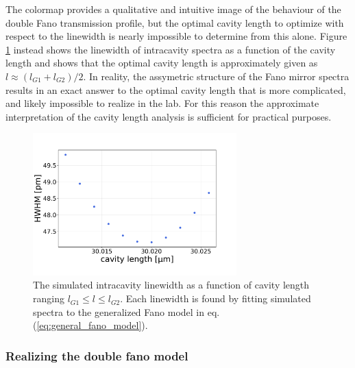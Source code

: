 The colormap provides a qualitative and intuitive image of the behaviour of the double Fano transmission profile, but the optimal cavity length to optimize with respect to the linewidth is nearly impossible to determine from this alone. Figure \ref{fig:G1/G2_lw_vs_cavity_length} instead shows the linewidth of intracavity spectra as a function of the cavity length and shows that the optimal cavity length is approximately given as $l \approx (l_{G1} + l_{G2})/2$. In reality, the assymetric structure of the Fano mirror spectra results in an exact answer to the optimal cavity length that is more complicated, and likely impossible to realize in the lab. For this reason the approximate interpretation of the cavity length analysis is sufficient for practical purposes.

\begin{figure}[h!]
    \centering
    \includegraphics[width=0.7\textwidth]{figures/results/M3:M5/M3:M5_lw_vs_length.pdf}
    \caption{The simulated intracavity linewidth as a function of cavity length ranging $l_{G1} \leq l \leq l_{G2}$. Each linewidth is found by fitting simulated spectra to the generalized Fano model in eq. (\ref{eq:general_fano_model}).}
    \label{fig:G1/G2_lw_vs_cavity_length}
\end{figure}

\newpage
\subsubsection{Realizing the double fano model}\label{sec:realizing_the_double_fano_model}

